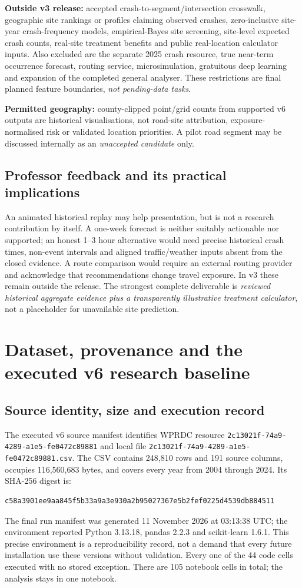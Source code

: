 \documentclass[11pt,a4paper,openany]{report}
\newcommand{\pathcode}[1]{\nolinkurl{#1}}
\begin{document}
\textbf{Outside v3 release:} accepted crash-to-segment/intersection crosswalk, geographic site rankings or profiles claiming observed crashes, zero-inclusive site-year crash-frequency models, empirical-Bayes site screening, site-level expected crash counts, real-site treatment benefits and public real-location calculator inputs. Also excluded are the separate 2025 crash resource, true near-term occurrence forecast, routing service, microsimulation, gratuitous deep learning and expansion of the completed general analyser. These restrictions are final planned feature boundaries, \emph{not pending-data tasks}.

\textbf{Permitted geography:} county-clipped point/grid counts from supported v6 outputs are historical visualisations, not road-site attribution, exposure-normalised risk or validated location priorities. A pilot road segment may be discussed internally as an \emph{unaccepted candidate} only.

\section{Professor feedback and its practical implications}
An animated historical replay may help presentation, but is not a research contribution by itself. A one-week forecast is neither suitably actionable nor supported; an honest 1--3 hour alternative would need precise historical crash times, non-event intervals and aligned traffic/weather inputs absent from the closed evidence. A route comparison would require an external routing provider and acknowledge that recommendations change travel exposure. In v3 these remain outside the release. The strongest complete deliverable is \emph{reviewed historical aggregate evidence plus a transparently illustrative treatment calculator}, not a placeholder for unavailable site prediction.

\chapter{Dataset, provenance and the executed v6 research baseline}
\section{Source identity, size and execution record}
The executed v6 source manifest identifies WPRDC resource \pathcode{2c13021f-74a9-4289-a1e5-fe0472c89881} and local file \pathcode{2c13021f-74a9-4289-a1e5-fe0472c89881.csv}. The CSV contains 248,810 rows and 191 source columns, occupies 116,560,683 bytes, and covers every year from 2004 through 2024. Its SHA-256 digest is:
\begin{lstlisting}
c58a3901ee9aa845f5b33a9a3e930a2b95027367e5b2fef0225d4539db884511
\end{lstlisting}
The final run manifest was generated 11 November 2026 at 03:13:38 UTC; the environment reported Python 3.13.18, pandas 2.2.3 and scikit-learn 1.6.1. This precise environment is a reproducibility record, not a demand that every future installation use these versions without validation. Every one of the 44 code cells executed with no stored exception. There are 105 notebook cells in total; the analysis stays in one notebook.
\end{document}
